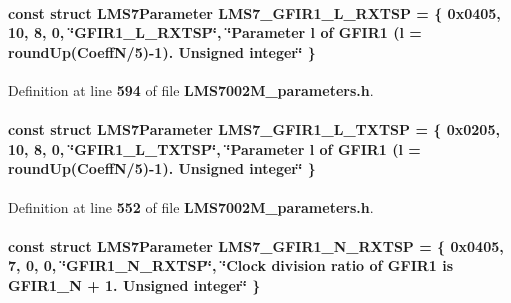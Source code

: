 \paragraph[{L\+M\+S7\+\_\+\+G\+F\+I\+R1\+\_\+\+L\+\_\+\+R\+X\+T\+SP}]{\setlength{\rightskip}{0pt plus 5cm}const struct {\bf L\+M\+S7\+Parameter} L\+M\+S7\+\_\+\+G\+F\+I\+R1\+\_\+\+L\+\_\+\+R\+X\+T\+SP = \{ 0x0405, 10, 8, 0, \char`\"{}\+G\+F\+I\+R1\+\_\+\+L\+\_\+\+R\+X\+T\+S\+P\char`\"{}, \char`\"{}\+Parameter l of G\+F\+I\+R1 (l = round\+Up(\+Coeff\+N/5)-\/1). Unsigned integer\char`\"{} \}\hspace{0.3cm}{\ttfamily [static]}}\label{LMS7002M__parameters_8h_a29b17df81ee4f9fbc6e1e64d8945aa24}


Definition at line {\bf 594} of file {\bf L\+M\+S7002\+M\+\_\+parameters.\+h}.

\paragraph[{L\+M\+S7\+\_\+\+G\+F\+I\+R1\+\_\+\+L\+\_\+\+T\+X\+T\+SP}]{\setlength{\rightskip}{0pt plus 5cm}const struct {\bf L\+M\+S7\+Parameter} L\+M\+S7\+\_\+\+G\+F\+I\+R1\+\_\+\+L\+\_\+\+T\+X\+T\+SP = \{ 0x0205, 10, 8, 0, \char`\"{}\+G\+F\+I\+R1\+\_\+\+L\+\_\+\+T\+X\+T\+S\+P\char`\"{}, \char`\"{}\+Parameter l of G\+F\+I\+R1 (l = round\+Up(\+Coeff\+N/5)-\/1). Unsigned integer\char`\"{} \}\hspace{0.3cm}{\ttfamily [static]}}\label{LMS7002M__parameters_8h_a224016381019cf3df184ce300dd9a8f6}


Definition at line {\bf 552} of file {\bf L\+M\+S7002\+M\+\_\+parameters.\+h}.

\paragraph[{L\+M\+S7\+\_\+\+G\+F\+I\+R1\+\_\+\+N\+\_\+\+R\+X\+T\+SP}]{\setlength{\rightskip}{0pt plus 5cm}const struct {\bf L\+M\+S7\+Parameter} L\+M\+S7\+\_\+\+G\+F\+I\+R1\+\_\+\+N\+\_\+\+R\+X\+T\+SP = \{ 0x0405, 7, 0, 0, \char`\"{}\+G\+F\+I\+R1\+\_\+\+N\+\_\+\+R\+X\+T\+S\+P\char`\"{}, \char`\"{}\+Clock division ratio of G\+F\+I\+R1 is G\+F\+I\+R1\+\_\+\+N + 1. Unsigned integer\char`\"{} \}\hspace{0.3cm}{\ttfamily [static]}}\label{LMS7002M__parameters_8h_ae0e3d4497ea6b6653761562367cc4c21}


